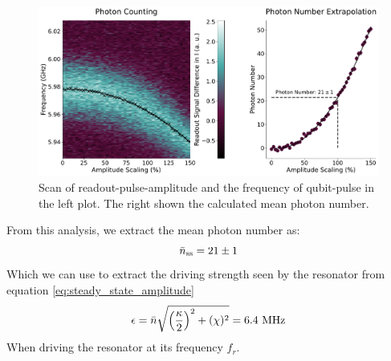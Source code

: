 \begin{figure}[h]
    \centering
    \includegraphics[width = \linewidth]{Calibrations/Figures/photon_number.pdf}
    \caption{Scan of readout-pulse-amplitude and the frequency of qubit-pulse in the left plot. The right shown the calculated mean photon number.}
    \label{fig:calibration_photon_counting_scan}
\end{figure}
From this analysis, we extract the mean photon number as:
\begin{equation}
    \Bar{n}_{\text{ss}} = 21 \pm 1
\end{equation}
Which we can use to extract the driving strength seen by the resonator from equation \ref{eq:steady_state_amplitude}
\begin{equation}
    \epsilon = \Bar{n} \sqrt{\left(\frac{\kappa}{2}\right)^2 + (\chi)^2} = 6.4 \text{ MHz}
\end{equation}
When driving the resonator at its frequency $f_r$.




